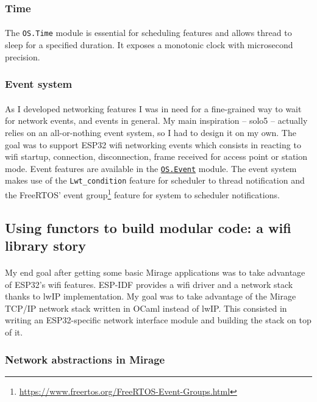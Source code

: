 \documentclass[a4paper]{article}
\begin{document}
\subsubsection{Time}
\paragraph{}
The \texttt{OS.Time} module is essential for scheduling features and allows thread to sleep for a specified duration. It exposes a monotonic clock with microsecond precision. 
\subsubsection{Event system}
\paragraph{}
As I developed networking features I was in need for a fine-grained way to wait for network events, and events in general. My main inspiration -- solo5 -- actually relies on an all-or-nothing event system, so I had to design it on my own. The goal was to support ESP32 wifi networking events which consists in reacting to wifi startup, connection, disconnection, frame received for access point or station mode. Event features are available in the \href{https://github.com/well-typed-lightbulbs/mirage-impl-esp32/blob/master/lib/event.ml}{\texttt{OS.Event}} module. 
The event system makes use of the \texttt{Lwt\_condition} feature for scheduler to thread notification and the FreeRTOS' event group\footnote{\url{https://www.freertos.org/FreeRTOS-Event-Groups.html}} feature for system to scheduler notifications. 

\subsection{Using functors to build modular code: a wifi library story}
\paragraph{}
My end goal after getting some basic Mirage applications was to take advantage of ESP32's wifi features. ESP-IDF provides a wifi driver and a network stack thanks to lwIP implementation. My goal was to take advantage of the Mirage TCP/IP network stack written in OCaml instead of lwIP. This consisted in writing an ESP32-specific network interface module and building the stack on top of it. 

\subsubsection{Network abstractions in Mirage}
\end{document}
